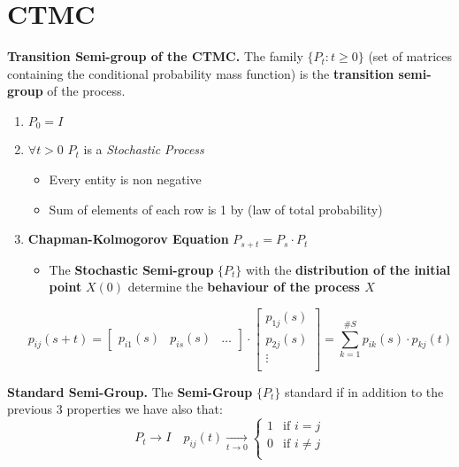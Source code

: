 \chapter{CTMC}
\begin{tcolorbox}
\textbf{Transition Semi-group of the CTMC.} The family $\{P_t : t \geq 0\}$ (set of matrices containing the conditional probability mass function) is the \textbf{transition semi-group} of the process.
\end{tcolorbox}
\begin{enumerate}
    \item $P_0 = I$
    \item $\forall t > 0$ $P_t$ is a \textit{Stochastic Process}
    \begin{itemize}
        \item Every entity is non negative
        \item Sum of elements of each row is 1 by (law of total probability)
    \end{itemize}
    \item \textbf{Chapman-Kolmogorov Equation} $P_{s+t} = P_s  \cdot P_t$
    \begin{itemize}
        \item The \textbf{Stochastic Semi-group} $\{P_t\}$ with the \textbf{distribution of the initial point} $X(0)$ determine the \textbf{behaviour of the process $X$}
    \end{itemize}
    
    $$
    p_{ij}(s+t) = 
    \begin{bmatrix}
    p_{i1}(s) & p_{is}(s) & \hdots
    \end{bmatrix}
    \cdot
    \begin{bmatrix}
    p_{1j}(s)\\
    p_{2j}(s)\\
    \vdots\\
    \end{bmatrix}
    = \sum_{k = 1}^{\#S} p_{ik}(s) \cdot p_{kj}(t)
    $$
    
\end{enumerate}

\begin{tcolorbox}
    \textbf{Standard Semi-Group.} The \textbf{Semi-Group} $\{P_t\}$ standard if in addition to the previous 3 properties we have also that:
$$
    P_t \rightarrow I \quad p_{ij}(t) \xrightarrow[t \rightarrow 0]{} \begin{cases}
        1 & \mbox{if } i = j\\
        0 & \mbox{if } i \neq j\\
    \end{cases}
$$
\end{tcolorbox}

